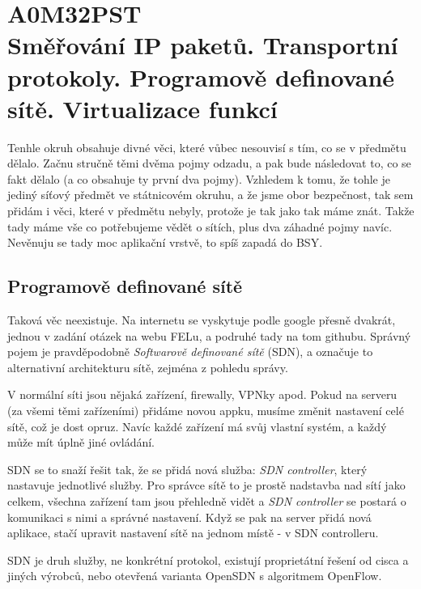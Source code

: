 \chapter[Pokročilé síťové technologie]{A0M32PST \\[1ex]\Large{Směřování IP paketů. Transportní protokoly. Programově definované sítě. Virtualizace funkcí}}



Tenhle okruh obsahuje divné věci, které vůbec nesouvisí s tím, co se v předmětu dělalo. Začnu stručně těmi dvěma pojmy odzadu, a pak bude následovat to, co se fakt dělalo (a co obsahuje ty první dva pojmy). Vzhledem k tomu, že tohle je jediný síťový předmět ve státnicovém okruhu, a že jsme obor bezpečnost, tak sem přidám i věci, které v předmětu nebyly, protože je tak jako tak máme znát. Takže tady máme vše co potřebujeme vědět o sítích, plus dva záhadné pojmy navíc. Nevěnuju se tady moc aplikační vrstvě, to spíš zapadá do BSY.



\section{Programově definované sítě}

Taková věc neexistuje. Na internetu se vyskytuje podle google přesně dvakrát, jednou v zadání otázek na webu FELu, a podruhé tady na tom githubu. Správný pojem je pravděpodobně \textit{Softwarově definované sítě} (SDN), a označuje to alternativní architekturu sítě, zejména z pohledu správy.

V normální síti jsou nějaká zařízení, firewally, VPNky apod. Pokud na serveru (za všemi těmi zařízeními) přidáme novou appku, musíme změnit nastavení celé sítě, což je dost opruz. Navíc každé zařízení má svůj vlastní systém, a každý může mít úplně jiné ovládání.

SDN se to snaží řešit tak, že se přidá nová služba: \textit{SDN controller}, který nastavuje jednotlivé služby. Pro správce sítě to je prostě nadstavba nad sítí jako celkem, všechna zařízení tam jsou přehledně vidět a \textit{SDN controller} se postará o komunikaci s nimi a správné nastavení. Když se pak na server přidá nová aplikace, stačí upravit nastavení sítě na jednom místě - v SDN controlleru.

SDN je druh služby, ne konkrétní protokol, existují proprietátní řešení od cisca a jiných výrobců, nebo otevřená varianta OpenSDN s algoritmem OpenFlow.



